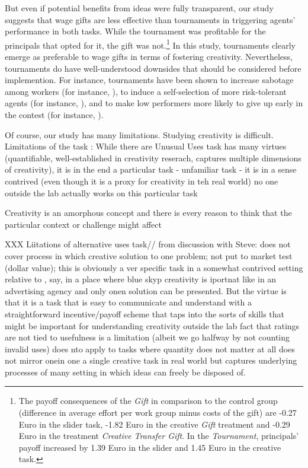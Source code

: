 But even if potential benefits from ideas were fully transparent, 
our study suggests that wage gifts are less effective than 
tournaments in triggering agents' performance in both tasks. 
While the tournament was profitable for the principals that opted 
for it, the gift was not.\footnote{The payoff consequences of the \textit{Gift}
 in comparison to the control group (difference in average effort per work group minus costs of the gift) 
are -0.27 Euro in the slider task, -1.82 Euro in the creative \textit{Gift} treatment and 
-0.29 Euro in the treatment \textit{Creative Transfer Gift}. In the \textit{Tournament}, 
principals' payoff increased by 1.39 Euro in the slider and 1.45 Euro in the creative task.} 
In this study, tournaments clearly emerge as preferable to  wage gifts in terms of fostering creativity. Nevertheless, tournaments do have 
well-understood downsides that should be considered before implemention. For instance, tournaments have been shown to 
increase sabotage among workers (for instance, \citealp{Harbring2011}), to induce a 
self-selection of more risk-tolerant agents (for instance, \citealp{Eriksson2009,Dohmen2011a}), 
and to make low performers more likely to give up early in the contest (for instance, \citealp{Berger2013}).

Of course, our study has many limitations. Studying creativity is difficult. 
Limitations of the task : While there are Unusual Uses task has many virtues (quantifiable, well-established in creativity reserach, captures multiple dimensions of creativity), it is in the end a particular task
- unfamiliar task
- it is in a sense contrived (even though it is a proxy for creativity in teh real world) no one outside the lab actually works on this particular task 

Creativity is an amorphous concept and there is every reason to think that the particular context or challenge might affect

XXX Liitations of alternative uses task// 
from discussion with Steve: does not cover process in which creative solution to one problem; not put to market test (dollar value); 
this is obviously a ver specific task in a somewhat contrived setting relative to , say, in a place where blue skyp creativity is iportnat like in an advertising agency and only onen solution can be presented. But the virtue is that it is a task that is easy to communicate and understand with a straightforward incentive/payoff scheme that taps into the sorts of skills that might be important for understanding creativity outside the lab
fact that ratings are not tied to usefulness is a limitation (albeit we go halfway by not counting invalid uses)
does nto apply to tasks where quantity does not matter at all
does not mirror onein one a single creative task in real world but captures underlying processes of many
setting in which ideas can freely be disposed of. 

